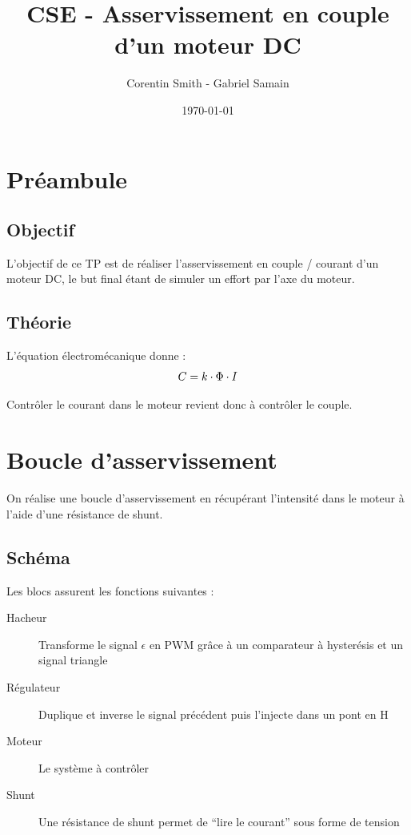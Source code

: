 \documentclass[a4paper]{article}
\title{CSE - Asservissement en couple d'un moteur DC}
\author{Corentin Smith - Gabriel Samain}
\date{\today}
\begin{document}
\maketitle


\section{Préambule}

\subsection{Objectif}

L'objectif de ce TP est de réaliser l'asservissement en couple / courant d'un moteur DC, le but final étant de simuler un effort par l'axe du moteur.

\subsection{Théorie}

L'équation électromécanique donne :
$$
C = k \cdot \Phi \cdot I \\
$$

Contrôler le courant dans le moteur revient donc à contrôler le couple.

\section{Boucle d'asservissement}

On réalise une boucle d’asservissement en récupérant l’intensité dans le moteur à l’aide d’une résistance de shunt.

\subsection{Schéma}

\begin{center}
\end{center}

Les blocs assurent les fonctions suivantes :
\begin{description}
  \item[Hacheur] 	Transforme le signal $\epsilon$ en PWM grâce à un comparateur à hysterésis et un signal triangle
  \item[Régulateur] Duplique et inverse le signal précédent puis l'injecte dans un pont en H
  \item[Moteur] 	Le système à contrôler
  \item[Shunt] 		Une résistance de shunt permet de “lire le courant” sous forme de tension
\end{description}
\end{document}
